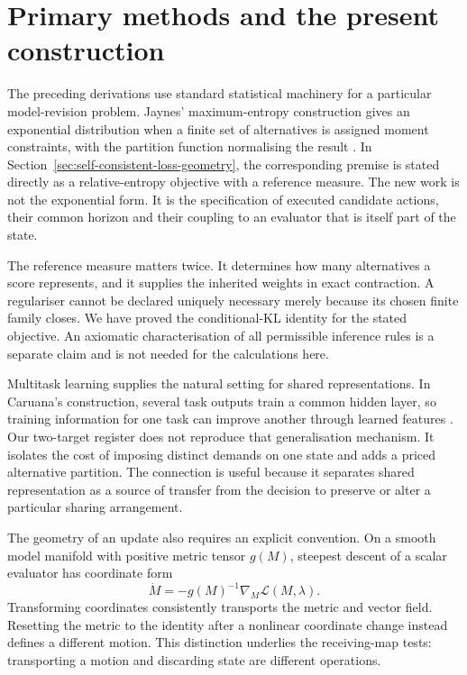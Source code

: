 \section{Primary methods and the present construction}
\label{sec:yba-background}

The preceding derivations use standard statistical machinery for a particular model-revision problem. Jaynes' maximum-entropy construction gives an exponential distribution when a finite set of alternatives is assigned moment constraints, with the partition function normalising the result \cite{jaynes1957information}. In Section~\ref{sec:self-consistent-loss-geometry}, the corresponding premise is stated directly as a relative-entropy objective with a reference measure. The new work is not the exponential form. It is the specification of executed candidate actions, their common horizon and their coupling to an evaluator that is itself part of the state.

The reference measure matters twice. It determines how many alternatives a score represents, and it supplies the inherited weights in exact contraction. A regulariser cannot be declared uniquely necessary merely because its chosen finite family closes. We have proved the conditional-KL identity for the stated objective. An axiomatic characterisation of all permissible inference rules is a separate claim and is not needed for the calculations here.

Multitask learning supplies the natural setting for shared representations. In Caruana's construction, several task outputs train a common hidden layer, so training information for one task can improve another through learned features \cite{caruana1997multitask}. Our two-target register does not reproduce that generalisation mechanism. It isolates the cost of imposing distinct demands on one state and adds a priced alternative partition. The connection is useful because it separates shared representation as a source of transfer from the decision to preserve or alter a particular sharing arrangement.

The geometry of an update also requires an explicit convention. On a smooth model manifold with positive metric tensor \(g(M)\), steepest descent of a scalar evaluator has coordinate form
\begin{equation}
 \dot M=-g(M)^{-1}\nabla_M\mathcal L(M,\lambda).
 \label{eq:yba-natural-flow}
\end{equation}
Transforming coordinates consistently transports the metric and vector field. Resetting the metric to the identity after a nonlinear coordinate change instead defines a different motion. This distinction underlies the receiving-map tests: transporting a motion and discarding state are different operations.

